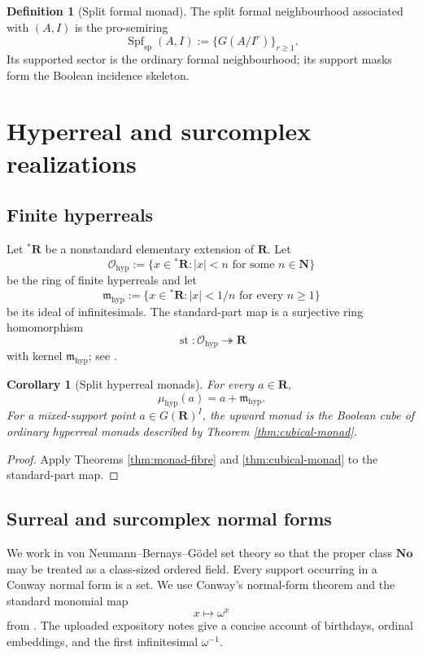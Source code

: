 \documentclass[11pt]{amsart}
\numberwithin{equation}{section}
\newtheorem{corollary}[theorem]{Corollary}
\theoremstyle{definition}
\newtheorem{definition}[theorem]{Definition}
\newcommand{\R}{\mathbf R}
\newcommand{\N}{\mathbf N}
\newcommand{\No}{\mathbf{No}}
\newcommand{\st}{\operatorname{st}}
\newcommand{\cO}{\mathcal O}
\begin{document}
\begin{definition}[Split formal monad]
The split formal neighbourhood associated with $(A,I)$ is the pro-semiring
\[
\operatorname{Spf}_{\mathrm{sp}}(A,I)
:=
\{G(A/I^r)\}_{r\ge1}.
\]
Its supported sector is the ordinary formal neighbourhood; its support masks form the Boolean incidence skeleton.
\end{definition}

\section{Hyperreal and surcomplex realizations}

\subsection{Finite hyperreals}

Let ${}^{\ast}\R$ be a nonstandard elementary extension of $\R$.  Let
\[
\cO_{\mathrm{hyp}}
:=
\{x\in{}^{\ast}\R:|x|<n\text{ for some }n\in\N\}
\]
be the ring of finite hyperreals and let
\[
\mathfrak m_{\mathrm{hyp}}
:=
\{x\in{}^{\ast}\R:|x|<1/n\text{ for every }n\ge1\}
\]
be its ideal of infinitesimals.  The standard-part map is a surjective ring homomorphism
\[
\st:\cO_{\mathrm{hyp}}\twoheadrightarrow\R
\]
with kernel $\mathfrak m_{\mathrm{hyp}}$; see \cite{Robinson,Goldblatt}.

\begin{corollary}[Split hyperreal monads]\label{cor:hyperreal-monads}
For every $a\in\R$,
\[
\mu_{\mathrm{hyp}}(a)
=
a+\mathfrak m_{\mathrm{hyp}}.
\]
For a mixed-support point $a\in G(\R)^I$, the upward monad is the Boolean cube of ordinary hyperreal monads described by Theorem \ref{thm:cubical-monad}.
\end{corollary}

\begin{proof}
Apply Theorems \ref{thm:monad-fibre} and \ref{thm:cubical-monad} to the standard-part map.
\end{proof}

\subsection{Surreal and surcomplex normal forms}

We work in von Neumann--Bernays--G\"odel set theory so that the proper class $\No$ may be treated as a class-sized ordered field.  Every support occurring in a Conway normal form is a set.  We use Conway's normal-form theorem and the standard monomial map
\[
x\longmapsto\omega^x
\]
from \cite{Conway}.  The uploaded expository notes \cite{Simons} give a concise account of birthdays, ordinal embeddings, and the first infinitesimal $\omega^{-1}$.
\end{document}
